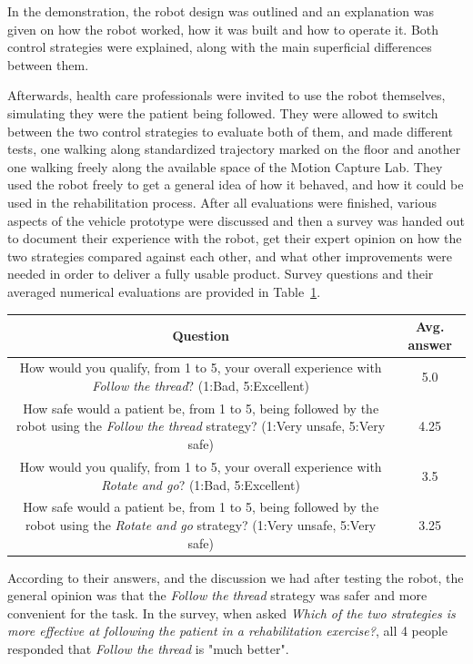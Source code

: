 \documentclass[journal]{IEEEtran}
\begin{document}
In the demonstration, the robot design was outlined and an explanation was given on how the robot worked, how it was built and how to operate it. Both control strategies were explained, along with the main superficial differences between them. 

Afterwards, health care professionals were invited to use the robot themselves, simulating they were the patient being followed. They were allowed to switch between the two control strategies to evaluate both of them, and made different tests, one walking along standardized trajectory marked on the floor and another one walking freely along the available space of the Motion Capture Lab. They used the robot freely to get a general idea of how it behaved, and how it could be used in the rehabilitation process. After all evaluations were finished, various aspects of the vehicle prototype were discussed and then a survey was handed out to document their experience with the robot, get their expert opinion on how the two strategies compared against each other, and what other improvements were needed in order to deliver a fully usable product.  Survey questions and their averaged numerical evaluations are provided in Table~\ref{tab:alpi_q_table_1}.

\begin{table}[t]
\begin{center}
\begin{tabular}[!t]{|c|c|}
\hline
Question & Avg. answer \\
\hline
How would you qualify, from 1 to 5, your overall experience with \textit{Follow the thread}? (1:Bad, 5:Excellent)  & 5.0\\
\hline
How safe would a patient be, from 1 to 5, being followed by the robot using the \textit{Follow the thread} strategy? (1:Very unsafe, 5:Very safe)  & 4.25\\
\hline
How would you qualify, from 1 to 5, your overall experience with \textit{Rotate and go}? (1:Bad, 5:Excellent)  & 3.5\\
\hline
How safe would a patient be, from 1 to 5, being followed by the robot using the \textit{Rotate and go} strategy? (1:Very unsafe, 5:Very safe) & 3.25\\
\hline
\end{tabular}
\label{tab:alpi_q_table_1}
\end{center}
\end{table}

According to their answers, and the discussion we had after testing the robot, the general opinion was that the \textit{Follow the thread} strategy was safer and more convenient for the task. In the survey, when asked \textit{Which of the two strategies is more effective at following the patient in a rehabilitation exercise?}, all 4 people responded that \textit{Follow the thread} is "much better".
\end{document}
